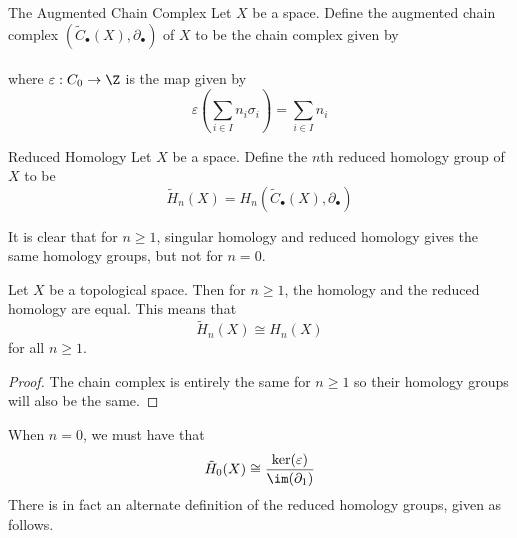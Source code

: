 \documentclass[a4paper]{article}
\begin{document}
\begin{defn}{The Augmented Chain Complex}{} Let $X$ be a space. Define the augmented chain complex $(\widetilde{C}_\bullet(X),\partial_\bullet)$ of $X$ to be the chain complex given by \\
\\
where $\varepsilon:C_0\to\Z$ is the map given by $$\varepsilon\left(\sum_{i\in I}n_i\sigma_i\right)=\sum_{i\in I}n_i$$
\end{defn}

\begin{defn}{Reduced Homology}{} Let $X$ be a space. Define the $n$th reduced homology group of $X$ to be $$\widetilde{H}_n(X)=H_n(\widetilde{C}_\bullet(X),\partial_\bullet)$$
\end{defn}

It is clear that for $n\geq 1$, singular homology and reduced homology gives the same homology groups, but not for $n=0$. 

\begin{lmm}{}{} Let $X$ be a topological space. Then for $n\geq 1$, the homology and the reduced homology are equal. This means that $$\widetilde{H}_n(X)\cong H_n(X)$$ for all $n\geq 1$. 
\begin{proof}
The chain complex is entirely the same for $n\geq 1$ so their homology groups will also be the same. 
\end{proof}
\end{lmm}

When $n=0$, we must have that $$\tilde{H}_0(X)\cong\frac{\ker(\varepsilon)}{\im(\partial_1)}$$ There is in fact an alternate definition of the reduced homology groups, given as follows. 
\end{document}
